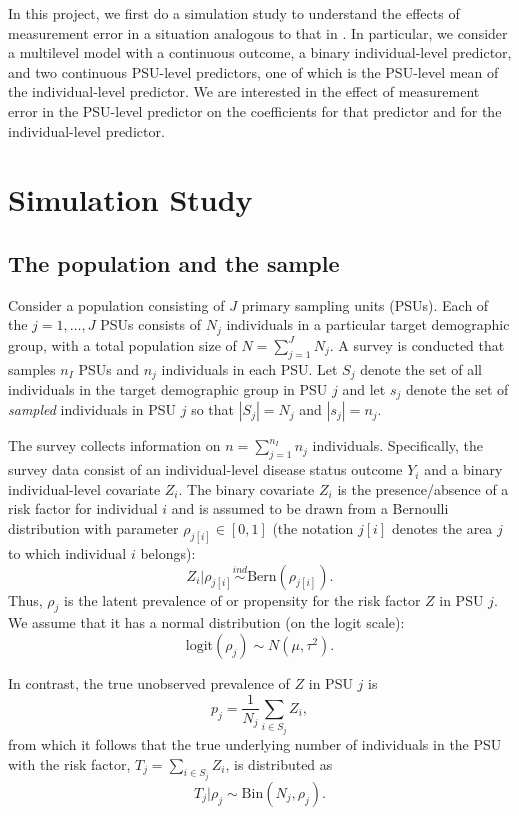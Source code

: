 \documentclass[10pt,a4paper]{article}
\newcommand*{\red}{\textcolor{red}}
\begin{document}
In this project, we first do a simulation study to understand the effects of measurement error in a situation analogous to that in \cite{gs2015}. In particular, we consider a multilevel model with a continuous outcome, a binary individual-level predictor, and two continuous PSU-level predictors, one of which is the PSU-level mean of the individual-level predictor. We are interested in the effect of measurement error in the PSU-level predictor on the coefficients for that predictor and for the individual-level predictor.

\section*{Simulation Study}
\subsection*{The population and the sample}
Consider a population consisting of $J$ primary sampling units (PSUs). Each of the $j = 1, \ldots, J$ PSUs consists of $N_j$ individuals in a particular target demographic group, with a total population size of $N = \sum_{j=1}^J N_j$. A survey is conducted that samples $n_I$ PSUs and $n_j$ individuals in each PSU. Let $S_j$ denote the set of all individuals in the target demographic group in PSU $j$ and let $s_j$ denote the set of \textit{sampled} individuals in PSU $j$ so that $|S_j| = N_j$ and $|s_j| = n_j$.

The survey collects information on $n = \sum_{j=1}^{n_I} n_j$ individuals. Specifically, the survey data consist of an individual-level disease status outcome $Y_i$ and a binary individual-level covariate $Z_i$. The binary covariate $Z_i$ is the presence/absence of a risk factor for individual $i$ and is assumed to be drawn from a Bernoulli distribution with parameter $\rho_{j[i]} \in [0,1]$ (the notation $j[i]$ denotes the area $j$ to which individual $i$ belongs):
\[
	Z_i | \rho_{j[i]} \overset{ind}{\sim} \textrm{Bern}(\rho_{j[i]}).
\]
Thus, $\rho_j$ is the latent prevalence of or propensity for the risk factor $Z$ in PSU $j$. We assume that it has a normal distribution (on the logit scale):
\[
	\textrm{logit}(\rho_j) \sim N(\mu, \tau^2).
\]

In contrast, the true unobserved prevalence of $Z$ in PSU $j$ is
\[
	p_j = \frac{1}{N_j} \sum_{i \in S_j} Z_i,
\]
from which it follows that the true underlying number of individuals in the PSU with the risk factor, $T_j = \sum_{i \in S_j} Z_i$, is distributed as
\[
	T_j | \rho_j \sim \mathrm{Bin}(N_j, \rho_j).
\]
\end{document}
